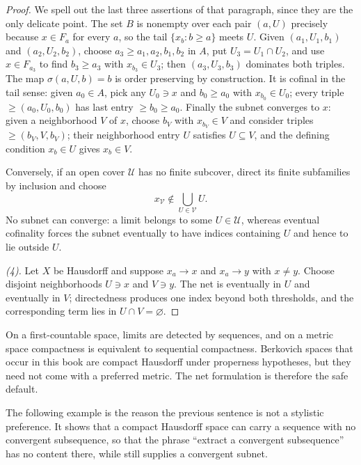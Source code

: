 \begin{proof}
We spell out the last three assertions of that paragraph, since they are the
only delicate point.  The set $B$ is nonempty over each pair $(a,U)$ precisely
because $x\in F_a$ for every $a$, so the tail $\{x_b:b\geq a\}$ meets $U$.
Given $(a_1,U_1,b_1)$ and $(a_2,U_2,b_2)$, choose $a_3\geq a_1,a_2,b_1,b_2$ in
$A$, put $U_3=U_1\cap U_2$, and use $x\in F_{a_3}$ to find $b_3\geq a_3$ with
$x_{b_3}\in U_3$; then $(a_3,U_3,b_3)$ dominates both triples.  The map
$\sigma(a,U,b)=b$ is order preserving by construction.  It is cofinal in the
tail sense: given $a_0\in A$, pick any $U_0\ni x$ and $b_0\geq a_0$ with
$x_{b_0}\in U_0$; every triple $\geq(a_0,U_0,b_0)$ has last entry
$\geq b_0\geq a_0$.  Finally the subnet converges to $x$: given a neighborhood
$V$ of $x$, choose $b_V$ with $x_{b_V}\in V$ and consider triples
$\geq(b_V,V,b_V)$; their neighborhood entry $U$ satisfies $U\subseteq V$, and
the defining condition $x_b\in U$ gives $x_b\in V$.

Conversely, if an open cover $\mathcal U$ has no finite
subcover, direct its finite subfamilies by inclusion and choose
\[
                  x_{\mathcal V}\notin\bigcup_{U\in\mathcal V}U.
\]
No subnet can converge: a limit belongs to some $U\in\mathcal U$, whereas
eventual cofinality forces the subnet eventually to have indices containing
$U$ and hence to lie outside $U$.

\emph{(4).}  Let $X$ be Hausdorff and suppose $x_a\to x$ and $x_a\to y$ with
$x\neq y$.  Choose disjoint neighborhoods $U\ni x$ and $V\ni y$.  The net is
eventually in $U$ and eventually in $V$; directedness produces one index
beyond both thresholds, and the corresponding term lies in $U\cap
V=\varnothing$.
\end{proof}

\begin{remark}
\label{rem:nets-safe-default}
On a first-countable space, limits are detected by sequences, and on a metric
space compactness is equivalent to sequential compactness.  Berkovich spaces
that occur in this book are compact Hausdorff under properness hypotheses,
but they need not come with a preferred metric.  The net formulation is
therefore the safe default.
\end{remark}

The following example is the reason the previous sentence is not a stylistic
preference.  It shows that a compact Hausdorff space can carry a sequence with
no convergent subsequence, so that the phrase ``extract a convergent
subsequence'' has no content there, while
 still supplies a convergent subnet.

